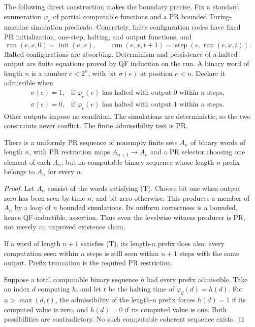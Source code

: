 The following direct construction makes the boundary precise. Fix a standard
enumeration $\varphi_e$ of partial computable functions and a PR bounded
Turing-machine simulation predicate. Concretely, finite configuration codes
have fixed PR initialization, one-step, halting, and output functions, and
\[
 \operatorname{run}(e,x,0)=\operatorname{init}(e,x),\qquad
 \operatorname{run}(e,x,t+1)
   =\operatorname{step}(e,\operatorname{run}(e,x,t)).
\]
Halted configurations are absorbing. Determinism and persistence of a
halted output are finite equations proved by QF induction on the run.
A binary word of length $n$ is a number
$c<2^n$, with bit $\sigma(e)$ at position $e<n$. Declare it admissible when
\[
 \begin{array}{ll}
 \sigma(e)=1,&\text{if }\varphi_e(e)\text{ has halted with output }0
                      \text{ within }n\text{ steps},\\
 \sigma(e)=0,&\text{if }\varphi_e(e)\text{ has halted with output }1
                      \text{ within }n\text{ steps}.
 \end{array}                                             \tag{T}
\]
Other outputs impose no condition. The simulations are deterministic, so
the two constraints never conflict. The finite admissibility test is PR.

\begin{theorem}
\label{thm:tree}
There is a uniformly PR sequence of nonempty finite sets $A_n$ of binary
words of length $n$, with PR restriction maps $A_{n+1}\to A_n$ and a PR
selector choosing one element of each $A_n$, but no computable binary
sequence whose length-$n$ prefix belongs to $A_n$ for every $n$.
\end{theorem}

\begin{proof}
Let $A_n$ consist of the words satisfying (T). Choose bit one when output
zero has been seen by time $n$, and bit zero otherwise. This produces a
member of $A_n$ by a loop of $n$ bounded simulations. Its uniform
correctness is a bounded, hence QF-inductible, assertion. Thus even the
levelwise witness producer is PR, not merely an unproved existence claim.

If a word of length $n+1$ satisfies (T), its length-$n$ prefix does also:
every computation seen within $n$ steps is still seen within $n+1$ steps
with the same output. Prefix truncation is the required PR restriction.

Suppose a total computable binary sequence $h$ had every prefix admissible.
Take an index $d$ computing $h$, and let $t$ be the halting time of
$\varphi_d(d)=h(d)$. For $n>\max(d,t)$, the admissibility of the
length-$n$ prefix forces $h(d)=1$ if its computed value is zero, and
$h(d)=0$ if its computed value is one. Both possibilities are contradictory.
No such computable coherent sequence exists.
\end{proof}

